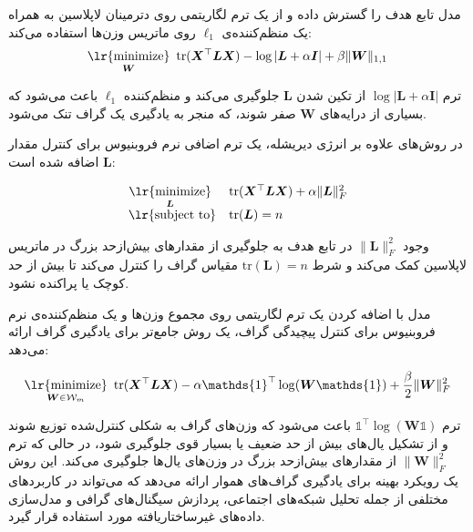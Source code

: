 \documentclass[10pt,twocolumn,a4paper]{article}
\newcommand\minimize[1]{\mathop{\text{\lr{minimize}}}\limits_{#1}\ }
\begin{document}
     مدل \cite{Lake2010DiscoveringSB} تابع هدف را گسترش داده و از یک ترم لگاریتمی روی دترمینان لاپلاسین به همراه یک منظم‌کننده‌ی \( \ell_1 \) روی ماتریس وزن‌ها استفاده می‌کند:
     \begin{equation}
     	     \minimize{\bm{W}} \text{tr} (\bm{X}^\top \bm{L} \bm{X}) - \log | \bm{L} + \alpha \bm{I} | + \beta \| \bm{W} \|_{1,1}
     \end{equation}
     
     ترم \( \log | \bm{L} + \alpha \bm{I} | \) از تکین شدن \( \bm{L} \) جلوگیری می‌کند و منظم‌کننده \( \ell_1 \) باعث می‌شود که بسیاری از درایه‌های \( \bm{W} \) صفر شوند، که منجر به یادگیری یک گراف تنک می‌شود.
     
     در روش‌های
     \cite{Hu2015,Dong2016}
      علاوه بر انرژی دیریشله، یک ترم اضافی نرم فروبنیوس برای کنترل مقدار \( \bm{L} \) اضافه شده است:
     
     \begin{equation}
 		\begin{array}{cl}
    	     \minimize{\bm{L}} & \text{tr} (\bm{X}^\top \bm{L} \bm{X}) + \alpha \|\bm{L}\|_F^2 \\
 			\text{\lr{subject to}} & \text{tr}(\bm{L}) = n
 		\end{array}
     \end{equation}
     
     وجود \( \|\bm{L}\|_F^2 \) در تابع هدف به جلوگیری از مقدارهای بیش‌ازحد بزرگ در ماتریس لاپلاسین کمک می‌کند و شرط \( \text{tr}(\bm{L}) = n \) مقیاس گراف را کنترل می‌کند تا بیش از حد کوچک یا پراکنده نشود.
     
     مدل 
     \cite{Kalofolias2016}
     با اضافه کردن یک ترم لگاریتمی روی مجموع وزن‌ها و یک منظم‌کننده‌ی نرم فروبنیوس برای کنترل پیچیدگی گراف، یک روش جامع‌تر برای یادگیری گراف ارائه می‌دهد:
     
\begin{equation}
	    \minimize{\bm{W}\in\mathcal{W}_m} \text{tr} (\bm{X}^\top \bm{L} \bm{X}) - \alpha \mathds{1}^\top \log (\bm{W} \mathds{1}) + \frac{\beta}{2} \|\bm{W}\|_F^2
\end{equation}
     
     ترم \( \mathds{1}^\top \log (\bm{W} \mathds{1}) \) باعث می‌شود که وزن‌های گراف به شکلی کنترل‌شده توزیع شوند و از تشکیل یال‌های بیش از حد ضعیف یا بسیار قوی جلوگیری شود، در حالی که ترم \( \|\bm{W}\|_F^2 \) از مقدارهای بیش‌ازحد بزرگ در وزن‌های یال‌ها جلوگیری می‌کند. این روش یک رویکرد بهینه برای یادگیری گراف‌های هموار ارائه می‌دهد که می‌تواند در کاربردهای مختلفی از جمله تحلیل شبکه‌های اجتماعی، پردازش سیگنال‌های گرافی و مدل‌سازی داده‌های غیرساختاریافته مورد استفاده قرار گیرد.
     
\end{document}
